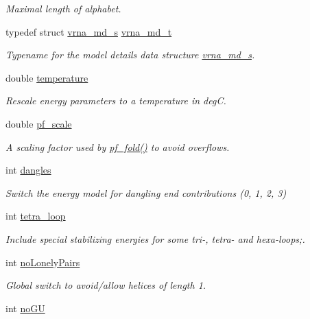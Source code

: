 \begin{DoxyCompactItemize}
\begin{DoxyCompactList}\small\item\em Maximal length of alphabet. \end{DoxyCompactList}\item 
typedef struct \hyperlink{structvrna__md__s}{vrna\+\_\+md\+\_\+s} \hyperlink{group__model__details_ga1f8a10e12a0a1915f2a4eff0b28ea17c}{vrna\+\_\+md\+\_\+t}\hypertarget{group__model__details_ga1f8a10e12a0a1915f2a4eff0b28ea17c}{}\label{group__model__details_ga1f8a10e12a0a1915f2a4eff0b28ea17c}

\begin{DoxyCompactList}\small\item\em Typename for the model details data structure \hyperlink{structvrna__md__s}{vrna\+\_\+md\+\_\+s}. \end{DoxyCompactList}\item 
double \hyperlink{group__model__details_gab4b11c8d9c758430960896bc3fe82ead}{temperature}
\begin{DoxyCompactList}\small\item\em Rescale energy parameters to a temperature in degC. \end{DoxyCompactList}\item 
double \hyperlink{group__model__details_gad3b22044065acc6dee0af68931b52cfd}{pf\+\_\+scale}
\begin{DoxyCompactList}\small\item\em A scaling factor used by \hyperlink{group__pf__fold_gadc3db3d98742427e7001a7fd36ef28c2}{pf\+\_\+fold()} to avoid overflows. \end{DoxyCompactList}\item 
int \hyperlink{group__model__details_ga72b511ed1201f7e23ec437e468790d74}{dangles}
\begin{DoxyCompactList}\small\item\em Switch the energy model for dangling end contributions (0, 1, 2, 3) \end{DoxyCompactList}\item 
int \hyperlink{group__model__details_ga4f6265bdf0ead7ff4628a360adbfd77e}{tetra\+\_\+loop}
\begin{DoxyCompactList}\small\item\em Include special stabilizing energies for some tri-\/, tetra-\/ and hexa-\/loops;. \end{DoxyCompactList}\item 
int \hyperlink{group__model__details_ga097eccaabd6ae8b4fef83cccff85bb5d}{no\+Lonely\+Pairs}
\begin{DoxyCompactList}\small\item\em Global switch to avoid/allow helices of length 1. \end{DoxyCompactList}\item 
int \hyperlink{group__model__details_gabf380d09e4f1ab94fc6af57cf0ad5d32}{no\+GU}\hypertarget{group__model__details_gabf380d09e4f1ab94fc6af57cf0ad5d32}{}\label{group__model__details_gabf380d09e4f1ab94fc6af57cf0ad5d32}


\end{DoxyCompactItemize}
